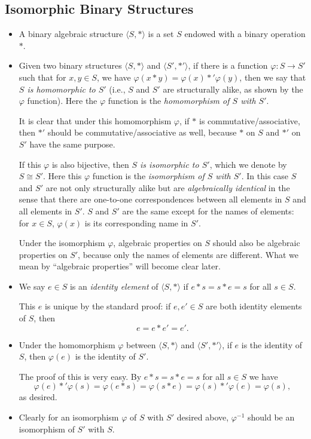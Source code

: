 \documentclass[11pt]{article}
\newcommand{\df}[1]{\textit{\textsf{#1}}}
\newcommand{\la}{\langle}
\newcommand{\ra}{\rangle}
\renewcommand{\phi}{\varphi}
\renewcommand{\simeq}{\cong}
\begin{document}
\subsection{Isomorphic Binary Structures}
\begin{itemize}
    \item A binary algebraic structure $\la S,\ast \ra$ is a set $S$ endowed with a binary operation $\ast$.
    \item Given two binary structures $\la S,\ast \ra$ and $\la S',\ast' \ra$, if there is a function $\phi\colon S \to S'$ such that for $x,y \in S$, we have $\phi(x \ast y) = \phi(x) \ast' \phi(y)$, then we say that \df{$S$ is homomorphic to $S'$} (i.e., $S$ and $S'$ are structurally alike, as shown by the $\phi$ function). Here the $\phi$ function is the \df{homomorphism of $S$ with $S'$}.

    It is clear that under this homomorphism $\phi$, if $\ast$ is commutative/associative, then $\ast'$ should be commutative/associative as well, because $\ast$ on $S$ and $\ast'$ on $S'$ have the same purpose.
    
    If this $\phi$ is also bijective, then \df{$S$ is isomorphic to $S'$}, which we denote by $S \simeq S'$. Here this $\phi$ function is the \df{isomorphism of $S$ with $S'$}. In this case $S$ and $S'$ are not only structurally alike but are \emph{algebraically identical} in the sense that there are one-to-one correspondences between all elements in $S$ and all elements in $S'$. $S$ and $S'$ are the same except for the names of elements: for $x \in S$, $\phi(x)$ is its corresponding name in $S'$.

    Under the isomorphism $\phi$, algebraic properties on $S$ should also be algebraic properties on $S'$, because only the names of elements are different. What we mean by ``algebraic properties'' will become clear later.
    \item We say $e \in S$ is an \df{identity element} of $\la S,\ast \ra$ if $e \ast s = s \ast e = s$ for all $s \in S$.
    
    This $e$ is unique by the standard proof: if $e,e' \in S$ are both identity elements of $S$, then \[e = e \ast e' = e'.\]
    \item Under the homomorphism $\phi$ between $\la S,\ast \ra$ and $\la S',\ast' \ra$, if $e$ is the identity of $S$, then $\phi(e)$ is the identity of $S'$.

    The proof of this is very easy. By $e \ast s = s \ast e = s$ for all $s \in S$ we have \[\phi(e) \ast' \phi(s) = \phi(e \ast s) = \phi (s \ast e) = \phi(s) \ast' \phi(e) = \phi(s),\] as desired.
    \item Clearly for an isomorphism $\phi$ of $S$ with $S'$ desired above, $\phi^{-1}$ should be an isomorphism of $S'$ with $S$.
    

\end{itemize}
\end{document}

